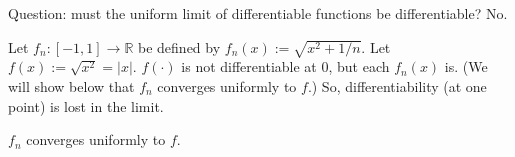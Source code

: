 Question: must the uniform limit of differentiable functions be differentiable? No.

\begin{example}

Let \(f_n: [-1,1] \to \mathbb{R}\) be defined by \(f_n(x) := \sqrt{x^2 + 1/n}\). Let \(f(x) := \sqrt{x^2} = |x|\). \(f(\cdot)\)  is not differentiable at 0, but each \(f_n(x)\) is. (We will show below that \(f_n\) converges uniformly to \(f\).) So, differentiability (at one point) is lost in the limit. 

\end{example}

\begin{proposition}

\(f_n\) converges uniformly to \(f\).

\end{proposition}

